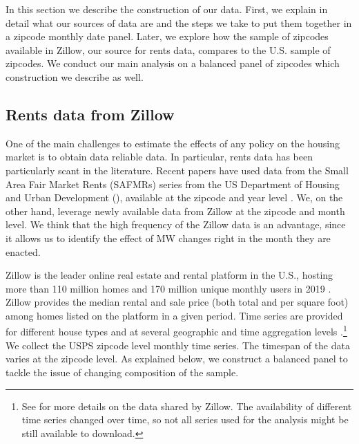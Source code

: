 
In this section we describe the construction of our data. First, we explain in detail
what our sources of data are and the steps we take to put them together in a zipcode
monthly date panel. Later, we explore how the sample of zipcodes available in Zillow, 
our source for rents data, compares to the U.S. sample of zipcodes. We conduct our 
main analysis on a balanced panel of zipcodes which construction we describe as well.

\subsection{Rents data from Zillow}

One of the main challenges to estimate the effects of any policy on the housing market
is to obtain data reliable data. In particular, rents data has been particularly scant
in the literature. Recent papers have used data from the Small Area Fair Market Rents 
(SAFMRs) series from the US Department of Housing and Urban Development (\citeyear{hud}), 
available at the zipcode and year level \parencite{Tidemann2018, Yamagishi2019}. We, 
on the other hand, leverage newly available data from Zillow at the zipcode and month 
level. We think that the high frequency of the Zillow data is an advantage, since it 
allows us to identify the effect of MW changes right in the month they are enacted.

Zillow is the leader online real estate and rental platform in the U.S., hosting more 
than 110 million homes and 170 million unique monthly users in 2019 
\parencite{ZillowFacts}. Zillow provides the median rental and sale price (both 
total and per square foot) among homes listed on the platform in a given period. Time 
series are provided for different house types and at several geographic and time 
aggregation levels \parencite{ZillowData}.\footnote{See \textcite{ZillowData} for 
	more details on the data shared by Zillow. The availability of different time 
	series changed over time, so not all series used for the analysis might be still 
	available to download.}
We collect the USPS zipcode level monthly time series. The timespan of the data 
varies at the zipcode level. As explained below, we construct a balanced panel to
tackle the issue of changing composition of the sample.

